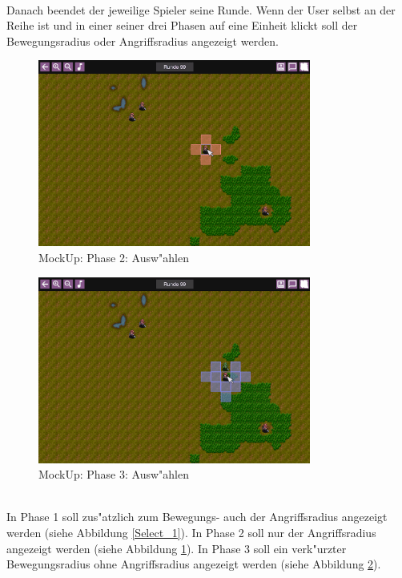 \documentclass[12pt, titlepage]{scrartcl}
\begin{document}
			        \ \\ Danach beendet der jeweilige Spieler seine Runde. Wenn der User selbst an der Reihe ist und in einer seiner drei Phasen auf eine Einheit klickt soll der Bewegungsradius oder Angriffsradius angezeigt werden. \\
                    \begin{figure}[H] 
    				    \centering
    				    \includegraphics[width=0.8\textwidth]{images/mockUps/ClickUnitAttackPhase.png}
    				    \caption{MockUp: Phase 2: Ausw"ahlen}
    				    \label{Select_2}
			        \end{figure} 
			        \begin{figure}[H] 
    				    \centering
    				    \includegraphics[width=0.8\textwidth]{images/mockUps/ClickUnitRestMovePhase.png}
    				    \caption{MockUp: Phase 3: Ausw"ahlen}
    				    \label{Select_3}
			        \end{figure} 
		            \ \\ In Phase 1 soll zus"atzlich zum Bewegungs- auch der Angriffsradius angezeigt werden (siehe Abbildung \ref{Select_1}). In Phase 2 soll nur der Angriffsradius angezeigt werden (siehe Abbildung \ref{Select_2}). In Phase 3 soll ein verk"urzter Bewegungsradius ohne Angriffsradius angezeigt werden (siehe Abbildung \ref{Select_3}).
\end{document}
